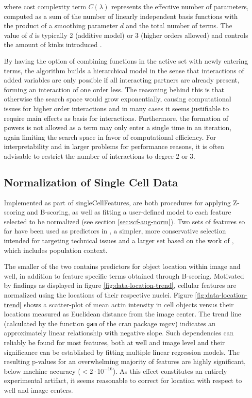 where cost complexity term $C(\lambda)$ represents the effective number of parameters, computed as a sum of the number of linearly independent basis functions with the product of a smoothing parameter $d$ and the total number of terms. The value of $d$ is typically 2 (additive model) or 3 (higher orders allowed) and controls the amount of kinks introduced \citep{Friedman1991}.

By having the option of combining functions in the active set with newly entering terms, the algorithm builds a hierarchical model in the sense that interactions of added variables are only possible if all interacting partners are already present, forming an interaction of one order less. The reasoning behind this is that otherwise the search space would grow exponentially, causing computational issues for higher order interactions and in many cases it seems justifiable to require main effects as basis for interactions. Furthermore, the formation of powers is not allowed as a term may only enter a single time in an iteration, again limiting the search space in favor of computational efficiency. For interpretability and in larger problems for performance reasons, it is often advisable to restrict the number of interactions to degree 2 or 3.

\subsection{Normalization of Single Cell Data}
Implemented as part of singleCellFeatures, are both procedures for applying Z-scoring and B-scoring, as well as fitting a user-defined  model to each feature selected to be normalized (see section \ref{sec:scf-aug-norm}). Two sets of features so far have been used as predictors in , a simpler, more conservative selection intended for targeting technical issues and a larger set based on the work of \citet{Knapp2011}, which includes population context.



The smaller of the two contains predictors for object location within image and well, in addition to feature specific terms obtained through B-scoring. Motivated by findings as displayed in figure \ref{fig:data-location-trend}, cellular features are normalized using the locations of their respective nuclei. Figure \ref{fig:data-location-trend} shows a scatter-plot of mean actin intensity in cell objects versus their locations measured as Euclidean distance from the image center. The trend line (calculated by the function \texttt{gam} of the \acrshort{cran} package mgcv) indicates an approximately linear relationship with negative slope. Such dependencies can reliably be found for most features, both at well and image level and their significance can be established by fitting multiple linear regression models. The resulting p-values for an overwhelming majority of features are highly significant, below machine accuracy ($<2\cdot10^{-16}$). As this effect constitutes an entirely experimental artifact, it seems reasonable to correct for location with respect to well and image centers.

